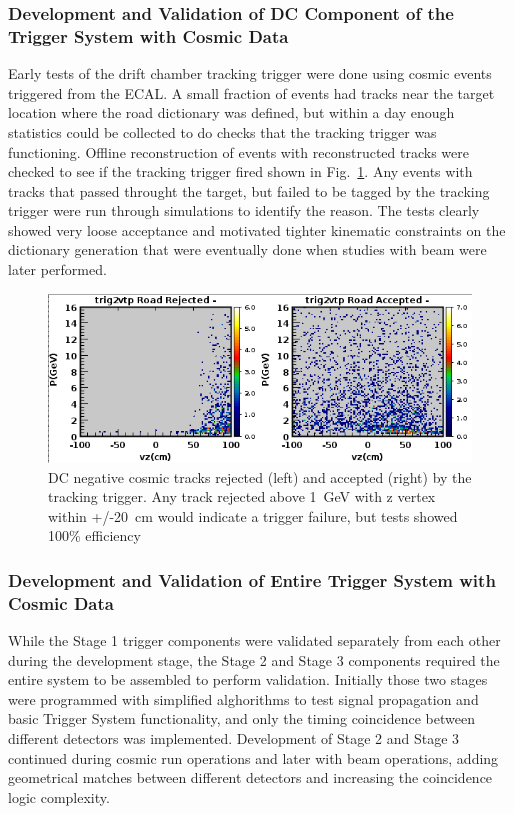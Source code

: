 \subsubsection{Development and Validation of DC Component of the Trigger System with Cosmic Data}

Early tests of the drift chamber tracking trigger were done using cosmic events triggered from the ECAL. A small fraction of events had tracks near the target location where the road dictionary was defined, but within a day enough statistics could be collected to do checks that the tracking trigger was functioning. Offline reconstruction of events with reconstructed tracks were checked to see if the tracking trigger fired shown in Fig.~\ref{fig:dc_cosmic_efficiency}. Any events with tracks that passed throught the target, but failed to be tagged by the tracking trigger were run through simulations to identify the reason. The tests clearly showed very loose acceptance and motivated tighter kinematic constraints on the dictionary generation that were eventually done when studies with beam were later performed.

\begin{figure}[!htb]
 	\centering
  	\includegraphics[width=1.0\columnwidth,keepaspectratio]{img/dc_cosmic_efficiency.png}
 	\caption{DC negative cosmic tracks rejected (left) and accepted (right) by the tracking trigger. Any track rejected above 1~GeV with z vertex within +/-20~cm would indicate a trigger failure, but tests showed 100\% efficiency}
	\label{fig:dc_cosmic_efficiency}
\end{figure}


\subsubsection{Development and Validation of Entire Trigger System with Cosmic Data} 

While the Stage 1 trigger components were validated separately from each other during the development stage, the Stage 2 and Stage 3 components required the entire system to be assembled to perform validation. Initially those two stages were programmed with simplified alghorithms to test signal propagation and basic Trigger System functionality, and only the timing coincidence between different detectors was implemented. Development of Stage 2 and Stage 3 continued during cosmic run operations and later with beam operations, adding geometrical matches between different detectors and increasing the coincidence logic complexity.


